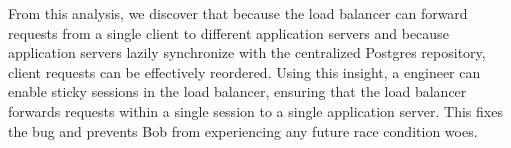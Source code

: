 From this analysis, we discover that because the load balancer can forward
requests from a single client to different application servers and because
application servers lazily synchronize with the centralized Postgres
repository, client requests can be effectively reordered. Using this insight, a
\systemname{} engineer can enable sticky sessions in the load balancer,
ensuring that the load balancer forwards requests within a single session to a
single application server. This fixes the bug and prevents Bob from
experiencing any future race condition woes.
